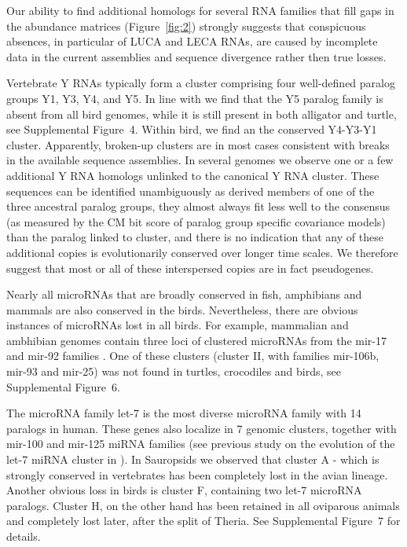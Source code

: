 \documentclass[10pt]{bmc_article}
\newenvironment{bmcformat}{\begin{raggedright}\baselineskip20pt\sloppy\setboolean{publ}{false}}{\end{raggedright}\baselineskip20pt\sloppy}
\begin{document}
\begin{bmcformat}
Our ability to find additional homologs for several RNA families that fill
gaps in the abundance matrices (Figure~\ref{fig:2})
strongly suggests that conspicuous absences, in particular of LUCA and
LECA RNAs, are caused by incomplete data in the current assemblies and
sequence divergence rather then true losses.


Vertebrate Y RNAs typically form a cluster comprising four
well-defined paralog groups Y1, Y3, Y4, and Y5. In line with
\cite{Mosig:07a} we find that the Y5 paralog family is absent from all
bird genomes, while it is still present in both alligator and turtle,
see Supplemental Figure~4. Within bird, we find an the conserved
Y4-Y3-Y1 cluster. Apparently, broken-up clusters are in most cases
consistent with breaks in the available sequence assemblies. In
several genomes we observe one or a few additional Y RNA homologs
unlinked to the canonical Y RNA cluster. These sequences can be
identified unambiguously as derived members of one of the three
ancestral paralog groups, they almost always fit less well to the
consensus (as measured by the CM bit score of paralog group specific
covariance models) than the paralog linked to cluster, and there is no
indication that any of these additional copies is evolutionarily
conserved over longer time scales. We therefore suggest that most or
all of these interspersed copies are in fact pseudogenes.


Nearly all microRNAs that are broadly conserved in fish, amphibians and
mammals are also conserved in the birds. Nevertheless, there are obvious
instances of microRNAs lost in all birds. For example, mammalian and
ambhibian genomes contain three loci of clustered microRNAs from the mir-17
and mir-92 families \cite{Tanzer:04}. One of these clusters (cluster II,
with families mir-106b, mir-93 and mir-25) was not found in turtles,
crocodiles and birds, see Supplemental Figure~6.

The microRNA family let-7 is the most diverse microRNA family with 14
paralogs in human. These genes also localize in 7 genomic clusters,
together with mir-100 and mir-125 miRNA families (see previous study on the
evolution of the let-7 miRNA cluster in \cite{Hertel:2012}). In Sauropsids
we observed that cluster A - which is strongly conserved in vertebrates has
been completely lost in the avian lineage. Another obvious loss in birds is
cluster F, containing two let-7 microRNA paralogs. Cluster H, on the other
hand has been retained in all oviparous animals and completely lost later,
after the split of Theria. See Supplemental Figure~7 for details.


\end{bmcformat}
\end{document}
